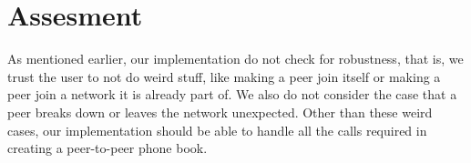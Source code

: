 \documentclass[10pt, a4paper]{article}
\begin{document}
\section{Assesment} %
\label{sec:assesment}

As mentioned earlier, our implementation do not check for robustness, that is, we trust the user to not do weird stuff, like making a peer join itself or making a peer join a network it is already part of.
We also do not consider the case that a peer breaks down or leaves the network unexpected.
Other than these weird cases, our implementation should be able to handle all the calls required in creating a peer-to-peer phone book.

\end{document}
